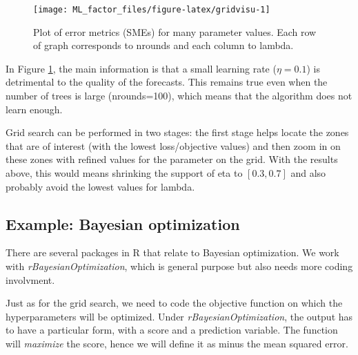 \documentclass[]{krantz}
\theoremstyle{definition}
\theoremstyle{definition}
\theoremstyle{definition}
\theoremstyle{remark}
\begin{document}
\begin{figure}[H]

{\centering \texttt{[image: ML\_factor\_files/figure-latex/gridvisu-1]} 

}

\caption{Plot of error metrics (SMEs) for many parameter values. Each row of graph corresponds to nrounds and each column to lambda.}\label{fig:gridvisu}
\end{figure}

\normalsize

In Figure \ref{fig:gridvisu}, the main information is that a small
learning rate (\(\eta=0.1\)) is detrimental to the quality of the
forecasts. This remains true even when the number of trees is large
(nrounds=100), which means that the algorithm does not learn enough.

Grid search can be performed in two stages: the first stage helps locate
the zones that are of interest (with the lowest loss/objective values)
and then zoom in on these zones with refined values for the parameter on
the grid. With the results above, this would means shrinking the support
of eta to \([0.3,0.7]\) and also probably avoid the lowest values for
lambda.

\hypertarget{example-bayesian-optimization}{%
\subsection{Example: Bayesian
optimization}\label{example-bayesian-optimization}}

There are several packages in R that relate to Bayesian optimization. We
work with \emph{rBayesianOptimization}, which is general purpose but
also needs more coding involvment.

Just as for the grid search, we need to code the objective function on
which the hyperparameters will be optimized. Under
\emph{rBayesianOptimization}, the output has to have a particular form,
with a score and a prediction variable. The function will
\emph{maximize} the score, hence we will define it as minus the mean
squared error.

\footnotesize
\end{document}
